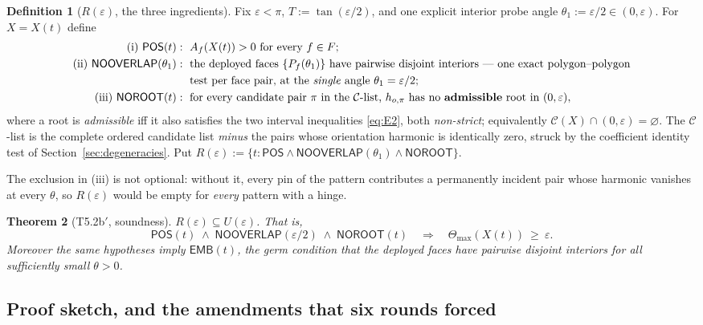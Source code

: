 \documentclass[11pt,a4paper]{article}
\newtheorem{theorem}{Theorem}[section]
\theoremstyle{definition}
\newtheorem{definition}[theorem]{Definition}
\newcommand{\Tmax}{\Theta_{\max}}
\newcommand{\POS}{\textsf{POS}}
\newcommand{\NOOV}{\textsf{NOOVERLAP}}
\newcommand{\NOROOT}{\textsf{NOROOT}}
\newcommand{\EMB}{\textsf{EMB}}
\begin{document}
\begin{definition}[$R(\varepsilon)$, the three ingredients]
\label{def:cert}
Fix $\varepsilon<\pi$, $T:=\tan(\varepsilon/2)$, and one explicit interior probe angle
$\theta_1:=\varepsilon/2\in(0,\varepsilon)$. For $X=X(t)$ define
\begin{align*}
\text{(i) } \POS(t):\;&\ A_f(X(t))>0 \text{ for every } f\in F;\\
\text{(ii) } \NOOV(\theta_1):\;&\ \text{the deployed faces }\{P_f(\theta_1)\}\text{ have
pairwise disjoint interiors --- one exact polygon--polygon}\\
&\ \text{test per face pair, at the \emph{single} angle }\theta_1=\varepsilon/2;\\
\text{(iii) } \NOROOT(t):\;&\ \text{for every candidate pair }\pi\text{ in the }
\mathcal{C}\text{-list, }h_{o,\pi}\text{ has no \textbf{admissible} root in }(0,\varepsilon),
\end{align*}
where a root is \emph{admissible} iff it also satisfies the two interval inequalities
\eqref{eq:E2}, both \emph{non-strict}; equivalently
$\mathcal{C}(X)\cap(0,\varepsilon)=\varnothing$. The $\mathcal{C}$-list is the complete
ordered candidate list \emph{minus} the pairs whose orientation harmonic is identically zero,
struck by the coefficient identity test of Section~\ref{sec:degeneracies}. Put
$R(\varepsilon):=\{t : \POS\wedge\NOOV(\theta_1)\wedge\NOROOT\}$.
\end{definition}

\noindent The exclusion in (iii) is not optional: without it, every pin of the pattern
contributes a permanently incident pair whose harmonic vanishes at every $\theta$, so
$R(\varepsilon)$ would be empty for \emph{every} pattern with a hinge.

\begin{theorem}[T5.2b$'$, soundness]
\label{thm:sound}
$R(\varepsilon)\subseteq U(\varepsilon)$. That is,
\[
\POS(t)\;\wedge\;\NOOV(\varepsilon/2)\;\wedge\;\NOROOT(t)
\quad\Longrightarrow\quad \Tmax(X(t))\ \ge\ \varepsilon .
\]
Moreover the same hypotheses imply $\EMB(t)$, the germ condition that the deployed faces have
pairwise disjoint interiors for all sufficiently small $\theta>0$.
\end{theorem}

\subsection{Proof sketch, and the amendments that six rounds forced}
\end{document}
